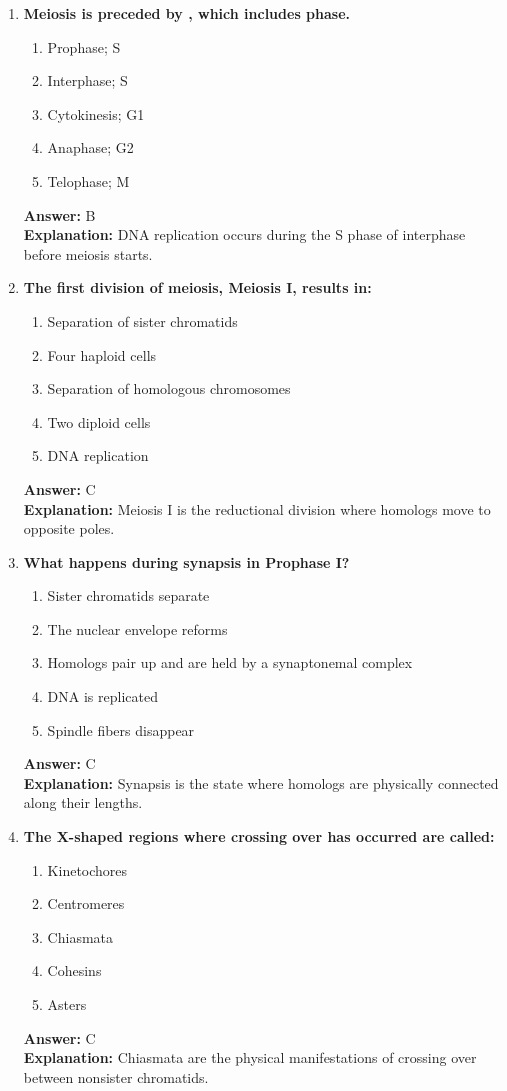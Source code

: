 \documentclass[11pt, a4paper]{article}
\begin{document}
\begin{enumerate}[leftmargin=*, label=\arabic*.]
\item \textbf{Meiosis is preceded by \underline{\hspace{1cm}}, which includes \underline{\hspace{1cm}} phase.}
\begin{enumerate}[label=\Alph*.]
\item Prophase; S
\item Interphase; S
\item Cytokinesis; G1
\item Anaphase; G2
\item Telophase; M
\end{enumerate}
\textbf{Answer:} B \\
\textbf{Explanation:} DNA replication occurs during the S phase of interphase before meiosis starts.

\item \textbf{The first division of meiosis, Meiosis I, results in:}
\begin{enumerate}[label=\Alph*.]
\item Separation of sister chromatids
\item Four haploid cells
\item Separation of homologous chromosomes
\item Two diploid cells
\item DNA replication
\end{enumerate}
\textbf{Answer:} C \\
\textbf{Explanation:} Meiosis I is the reductional division where homologs move to opposite poles.

\item \textbf{What happens during synapsis in Prophase I?}
\begin{enumerate}[label=\Alph*.]
\item Sister chromatids separate
\item The nuclear envelope reforms
\item Homologs pair up and are held by a synaptonemal complex
\item DNA is replicated
\item Spindle fibers disappear
\end{enumerate}
\textbf{Answer:} C \\
\textbf{Explanation:} Synapsis is the state where homologs are physically connected along their lengths.

\item \textbf{The X-shaped regions where crossing over has occurred are called:}
\begin{enumerate}[label=\Alph*.]
\item Kinetochores
\item Centromeres
\item Chiasmata
\item Cohesins
\item Asters
\end{enumerate}
\textbf{Answer:} C \\
\textbf{Explanation:} Chiasmata are the physical manifestations of crossing over between nonsister chromatids.


\end{enumerate}
\end{document}

